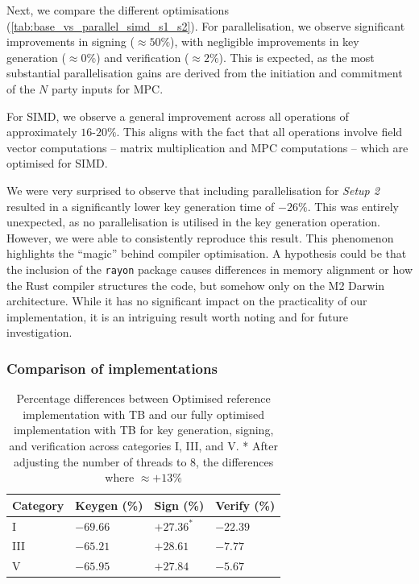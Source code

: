 \documentclass[11pt]{report}
\theoremstyle{definition}
\theoremstyle{plain}
\begin{document}
Next, we compare the different optimisations (\autoref{tab:base_vs_parallel_simd_s1_s2}). For parallelisation, we observe significant improvements in signing ($\approx 50\%$), with negligible improvements in key generation ($\approx 0\%$) and verification ($\approx 2\%$). This is expected, as the most substantial parallelisation gains are derived from the initiation and commitment of the $N$ party inputs for MPC.

For SIMD, we observe a general improvement across all operations of approximately $16$-$20\%$. This aligns with the fact that all operations involve field vector computations -- matrix multiplication and MPC computations -- which are optimised for SIMD.

We were very surprised to observe that including parallelisation for \textit{Setup 2} resulted in a significantly lower key generation time of $-26\%$. This was entirely unexpected, as no parallelisation is utilised in the key generation operation. However, we were able to consistently reproduce this result. This phenomenon highlights the ``magic'' behind compiler optimisation. A hypothesis could be that the inclusion of the \texttt{rayon} package causes differences in memory alignment or how the Rust compiler structures the code, but somehow only on the M2 Darwin architecture. While it has no significant impact on the practicality of our implementation, it is an intriguing result worth noting and for future investigation.

\subsubsection{Comparison of implementations}\label{sub:comparison_implementations}

\begin{table}[H]
  \centering
  \begin{tabular}{l|lll}
    \hline
    Category & Keygen (\%) & Sign (\%)  & Verify (\%) \\
    \hline
    I        & $-69.66$    & $+27.36^*$ & $-22.39$    \\
    III      & $-65.21$    & $+28.61$   & $-7.77$     \\
    V        & $-65.95$    & $+27.84$   & $-5.67$     \\
    \hline
  \end{tabular}
  \caption{Percentage differences between Optimised reference implementation with TB and our fully optimised implementation with TB for key generation, signing, and verification across categories I, III, and V. * After adjusting the number of threads to 8, the differences where $\approx +13\%$}
  \label{tab:optimized_vs_simd_parallel_tb_new}
\end{table}
\end{document}

